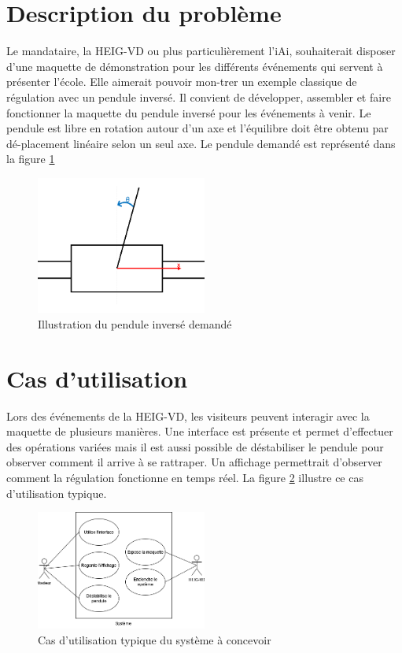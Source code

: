 \section{Description du problème}\label{sec:DescProb}
Le mandataire, la HEIG-VD ou plus particulièrement l'iAi, souhaiterait disposer d'une maquette de démonstration pour les différents événements qui servent à présenter l'école. Elle aimerait pouvoir mon-trer un exemple classique de régulation avec un pendule inversé.
Il convient de développer, assembler et faire fonctionner la maquette du pendule inversé pour les événements à venir. Le pendule est libre en rotation autour d'un axe et l'équilibre doit être obtenu par dé-placement linéaire selon un seul axe. Le pendule demandé est représenté dans la figure \ref{fig:Illustration}

\begin{figure}[H]
    \centering
    \includegraphics[width = 0.5\textwidth]{assets/figures/IllustrationPendule.png}
    \caption{Illustration du pendule inversé demandé}
    \label{fig:Illustration}
\end{figure}

\section{Cas d'utilisation}\label{sec:CasUtil}
Lors des événements de la HEIG-VD, les visiteurs peuvent interagir avec la maquette de plusieurs manières. Une interface est présente et permet d'effectuer des opérations variées mais il est aussi possible de déstabiliser le pendule pour observer comment il arrive à se rattraper. Un affichage permettrait d'observer comment la régulation fonctionne en temps réel.
La figure \ref{fig:CasUtil} illustre ce cas d'utilisation typique.

\begin{figure}[H]
    \centering
    \includegraphics[width = 0.5\textwidth]{assets/figures/CasUtil.png}
    \caption{Cas d'utilisation typique  du système à concevoir}
    \label{fig:CasUtil}
\end{figure}

